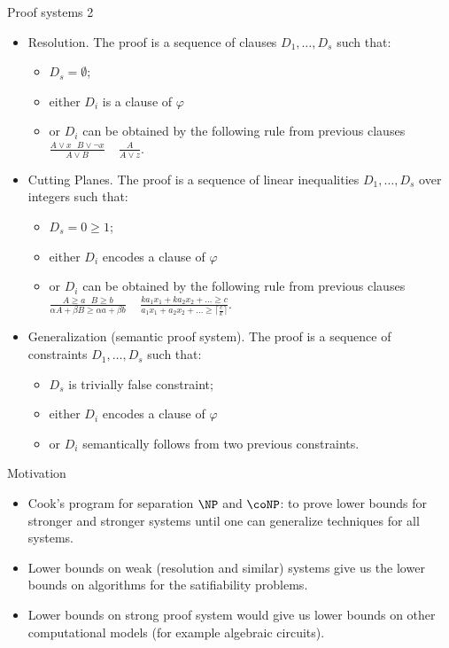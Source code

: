 \begin{frame}{Proof systems 2}
    \begin{itemize}
        \item Resolution. The proof is a sequence of clauses $D_1, \dots, D_s$ such that:
            \begin{itemize}
                \item $D_s = \emptyset$;
                \item either $D_i$ is a clause of $\varphi$
                \item or $D_i$ can be obtained by the following rule from previous clauses $\frac{A \lor
                    x ~~~ B \lor \neg x}{A \lor B} ~~~~~ \frac{A}{A \lor z}$.
            \end{itemize}
        \pause
        \item Cutting Planes. The proof is a sequence of linear inequalities $D_1, \dots, D_s$ over integers such that:
            \begin{itemize}
                \item $D_s = 0 \ge 1$;
                \item either $D_i$ encodes a clause of $\varphi$
                \item or $D_i$ can be obtained by the following rule from previous clauses $\frac{A \ge a
                    ~~~ B \ge b}{\alpha A + \beta B \ge \alpha a + \beta b} ~~~~~ \frac{ka_1 x_1 + ka_2
                    x_2 + \dots \ge c}{a_1 x_1 + a_2 x_2 + \dots \ge \lceil \frac{c}{k} \rceil}$.
            \end{itemize}
        \pause
        \item Generalization (semantic proof system). The proof is a sequence of constraints $D_1, \dots, D_s$ such that:
            \begin{itemize}
                \item $D_s$ is trivially false constraint;
                \item either $D_i$ encodes a clause of $\varphi$
                \item or $D_i$ semantically follows from two previous constraints.
            \end{itemize}
    \end{itemize}
\end{frame}


\begin{frame}{Motivation}
    \begin{itemize}
        \item Cook's program for separation $\NP$ and $\coNP$: to prove lower bounds for {\color{blue}
            stronger and stronger} systems until one can generalize techniques for all systems.
        \pause
        \item Lower bounds on {\color{blue} weak} (resolution and similar) systems give us the lower
            bounds on algorithms for the satifiability problems.
        \pause
        \item Lower bounds on {\color{blue} strong} proof system would give us lower bounds on other
            computational models (for example algebraic circuits).
    \end{itemize}
\end{frame}